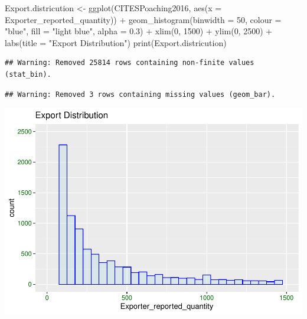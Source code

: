 \documentclass[
  12pt,
]{article}
\newenvironment{Shaded}{\begin{snugshade}}{\end{snugshade}}
\newcommand{\AttributeTok}[1]{\textcolor[rgb]{0.77,0.63,0.00}{#1}}
\newcommand{\DecValTok}[1]{\textcolor[rgb]{0.00,0.00,0.81}{#1}}
\newcommand{\FloatTok}[1]{\textcolor[rgb]{0.00,0.00,0.81}{#1}}
\newcommand{\FunctionTok}[1]{\textcolor[rgb]{0.00,0.00,0.00}{#1}}
\newcommand{\NormalTok}[1]{#1}
\newcommand{\OtherTok}[1]{\textcolor[rgb]{0.56,0.35,0.01}{#1}}
\newcommand{\SpecialCharTok}[1]{\textcolor[rgb]{0.00,0.00,0.00}{#1}}
\newcommand{\StringTok}[1]{\textcolor[rgb]{0.31,0.60,0.02}{#1}}
\begin{document}
\begin{Shaded}
\begin{Highlighting}[]
\NormalTok{Export.districution }\OtherTok{\textless{}{-}} \FunctionTok{ggplot}\NormalTok{(CITESPoaching2016, }\FunctionTok{aes}\NormalTok{(}\AttributeTok{x =}\NormalTok{ Exporter\_reported\_quantity)) }\SpecialCharTok{+}
    \FunctionTok{geom\_histogram}\NormalTok{(}\AttributeTok{binwidth =} \DecValTok{50}\NormalTok{, }\AttributeTok{colour =} \StringTok{"blue"}\NormalTok{, }\AttributeTok{fill =} \StringTok{"light blue"}\NormalTok{, }\AttributeTok{alpha =} \FloatTok{0.3}\NormalTok{) }\SpecialCharTok{+}
    \FunctionTok{xlim}\NormalTok{(}\DecValTok{0}\NormalTok{, }\DecValTok{1500}\NormalTok{) }\SpecialCharTok{+} \FunctionTok{ylim}\NormalTok{(}\DecValTok{0}\NormalTok{, }\DecValTok{2500}\NormalTok{) }\SpecialCharTok{+} \FunctionTok{labs}\NormalTok{(}\AttributeTok{title =} \StringTok{"Export Distribution"}\NormalTok{)}
\FunctionTok{print}\NormalTok{(Export.districution)}
\end{Highlighting}
\end{Shaded}

\begin{verbatim}
## Warning: Removed 25814 rows containing non-finite values (stat_bin).
\end{verbatim}

\begin{verbatim}
## Warning: Removed 3 rows containing missing values (geom_bar).
\end{verbatim}

\includegraphics{Wood_ENV872_Project_files/figure-latex/unnamed-chunk-4-1.pdf}
\end{document}
